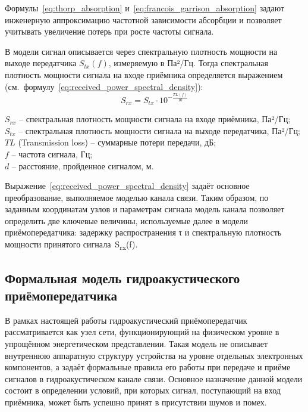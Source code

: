 \documentclass[
    numbers=section,
    document-code={ВКРБ--09.03.04--10.19--XX--26--81}
]{../latex/fqw}
\providecommand{\hl}[1]{#1}
\begin{document}
    \hl{}

    Формулы~\eqref{eq:thorp_absorption} и~\eqref{eq:francois_garrison_absorption}
    задают инженерную аппроксимацию частотной зависимости абсорбции и
    позволяет учитывать увеличение потерь при росте частоты сигнала.

    В модели сигнал описывается через спектральную плотность мощности на выходе передатчика \(S_{tx}(f)\),
    измеряемую в Па²/Гц.
    Тогда спектральная плотность мощности сигнала на входе приёмника определяется выражением
    (см.~формулу~\eqref{eq:received_power_spectral_density}):
    \begin{equation}
        S_{rx} = S_{tx} \cdot 10^{-\frac{TL(f)}{10}}
        \label{eq:received_power_spectral_density}
    \end{equation}
    \begin{FqwWhere}
        \(S_{rx}\) -- спектральная плотность мощности сигнала на входе приёмника, Па²/Гц;\\
        \(S_{tx}\) -- спектральная плотность мощности сигнала на выходе передатчика, Па²/Гц;\\
        \(TL\) (Transmission loss) -- суммарные потери передачи, дБ;\\
        \(f\) -- частота сигнала, Гц;\\
        \(d\) -- расстояние, пройденное сигналом, м.
    \end{FqwWhere}

    Выражение~\eqref{eq:received_power_spectral_density} задаёт основное преобразование,
    выполняемое моделью канала связи.
    Таким образом, по заданным координатам узлов и параметрам сигнала
    модель канала позволяет определить две ключевые величины, используемые далее в модели приёмопередатчика:
    задержку распространения τ и
    спектральную плотность мощности принятого сигнала~S\textsubscript{rx}(f).

    \subsection{Формальная модель гидроакустического приёмопередатчика}
    \label{subsec:formal_model_of_hydroacoustic_transceiver}

    В рамках настоящей работы гидроакустический приёмопередатчик рассматривается как узел сети,
    функционирующий на физическом уровне в упрощённом энергетическом представлении.
    Такая модель не описывает внутреннюю аппаратную структуру устройства на уровне отдельных электронных компонентов,
    а задаёт формальные правила его работы при передаче и приёме сигналов в гидроакустическом канале связи.
    Основное назначение данной модели состоит в определении условий, при которых сигнал,
    поступающий на вход приёмника, может быть успешно принят в присутствии шумов и помех.
\end{document}

